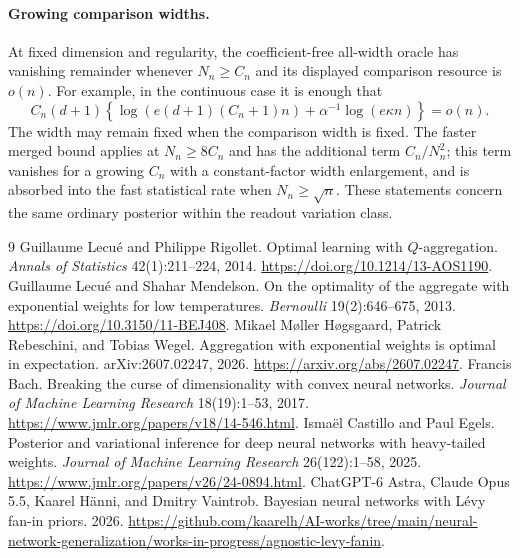\documentclass[11pt]{article}
\begin{document}




\paragraph{Growing comparison widths.}
At fixed dimension and regularity, the coefficient-free all-width oracle has vanishing remainder whenever $N_n\ge C_n$ and its displayed comparison resource is $o(n)$. For example, in the continuous case it is enough that
\[
 C_n(d+1)
 \left\{\log(e(d+1)(C_n+1)n)+\alpha^{-1}\log(e\kappa n)\right\}=o(n).
\]
The width may remain fixed when the comparison width is fixed. The faster merged bound applies at $N_n\ge8C_n$ and has the additional term $C_n/N_n^2$; this term vanishes for a growing $C_n$ with a constant-factor width enlargement, and is absorbed into the fast statistical rate when $N_n\ge\sqrt n$. These statements concern the same ordinary posterior within the readout variation class.

\begin{thebibliography}{9}
 Guillaume Lecu\'e and Philippe Rigollet. Optimal learning with $Q$-aggregation. \emph{Annals of Statistics} 42(1):211--224, 2014. \url{https://doi.org/10.1214/13-AOS1190}.
 Guillaume Lecu\'e and Shahar Mendelson. On the optimality of the aggregate with exponential weights for low temperatures. \emph{Bernoulli} 19(2):646--675, 2013. \url{https://doi.org/10.3150/11-BEJ408}.
 Mikael M\o ller H\o gsgaard, Patrick Rebeschini, and Tobias Wegel. Aggregation with exponential weights is optimal in expectation. arXiv:2607.02247, 2026. \url{https://arxiv.org/abs/2607.02247}.
 Francis Bach. Breaking the curse of dimensionality with convex neural networks. \emph{Journal of Machine Learning Research} 18(19):1--53, 2017. \url{https://www.jmlr.org/papers/v18/14-546.html}.
 Isma\"el Castillo and Paul Egels. Posterior and variational inference for deep neural networks with heavy-tailed weights. \emph{Journal of Machine Learning Research} 26(122):1--58, 2025. \url{https://www.jmlr.org/papers/v26/24-0894.html}.
 ChatGPT-6 Astra, Claude Opus 5.5, Kaarel H\"anni, and Dmitry Vaintrob. Bayesian neural networks with L\'evy fan-in priors. 2026. \url{https://github.com/kaarelh/AI-works/tree/main/neural-network-generalization/works-in-progress/agnostic-levy-fanin}.
\end{thebibliography}
\end{document}

